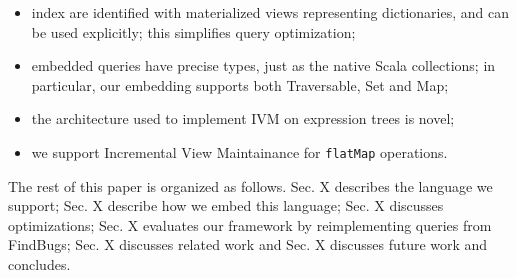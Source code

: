 \documentclass[preprint,authoryear,10pt]{sigplanconf}
\begin{document}
\begin{itemize}
\item
  index are identified with materialized views representing
  dictionaries, and can be used explicitly; this simplifies query
  optimization;
\item
  embedded queries have precise types, just as the native Scala
  collections; in particular, our embedding supports both Traversable,
  Set and Map;
\item
  the architecture used to implement IVM on expression trees is novel;
\item
  we support Incremental View Maintainance for \texttt{flatMap}
  operations.
\end{itemize}
The rest of this paper is organized as follows. Sec. X describes the
language we support; Sec. X describe how we embed this language; Sec. X
discusses optimizations; Sec. X evaluates our framework by
reimplementing queries from FindBugs; Sec. X discusses related work and
Sec. X discusses future work and concludes.
\end{document}
